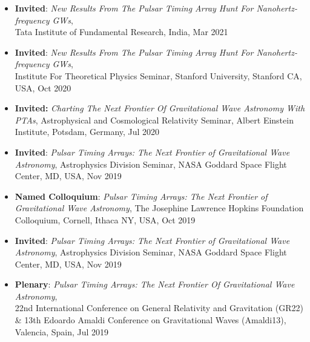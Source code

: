 \documentclass[11pt,letterpaper,sans]{moderncv}
\begin{document}
\begin{itemize}[leftmargin=8mm]

\item \textbf{Invited}: \textit{New Results From The Pulsar Timing Array Hunt For Nanohertz-frequency GWs}, \\ Tata Institute of Fundamental Research, India, Mar 2021

\item \textbf{Invited}: \textit{New Results From The Pulsar Timing Array Hunt For Nanohertz-frequency GWs}, \\ Institute For Theoretical Physics Seminar, Stanford University, Stanford CA, USA, Oct 2020

\item \textbf{Invited:} \textit{Charting The Next Frontier Of Gravitational Wave Astronomy With PTAs}, Astrophysical and Cosmological Relativity Seminar, Albert Einstein Institute, Potsdam, Germany, Jul 2020

\item \textbf{Invited}: \textit{Pulsar Timing Arrays: The Next Frontier of Gravitational Wave Astronomy}, Astrophysics Division Seminar, NASA Goddard Space Flight Center, MD, USA, Nov 2019

\item \textbf{Named Colloquium}: \textit{Pulsar Timing Arrays: The Next Frontier of Gravitational Wave Astronomy}, The Josephine Lawrence Hopkins Foundation Colloquium, Cornell, Ithaca NY, USA, Oct 2019

\item \textbf{Invited}: \textit{Pulsar Timing Arrays: The Next Frontier of Gravitational Wave Astronomy}, Astrophysics Division Seminar, NASA Goddard Space Flight Center, MD, USA, Nov 2019

\item \textbf{Plenary}: \textit{Pulsar Timing Arrays: The Next Frontier Of Gravitational Wave Astronomy}, \\ 22nd International Conference on General Relativity and Gravitation (GR22) \& 13th Edoardo Amaldi Conference on Gravitational Waves (Amaldi13), Valencia, Spain, Jul 2019




\end{itemize}
\end{document}
